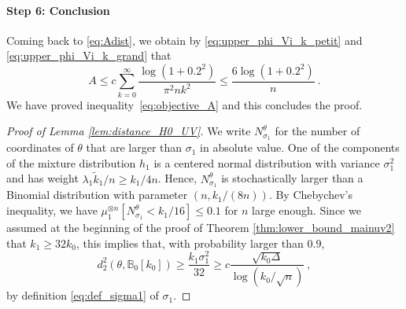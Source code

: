 \documentclass[twoside,11pt]{article}
\def\bbB{\mathbb{B}}
\newcommand{\<}{\langle}
\renewcommand{\>}{\rangle}
\begin{document}
\paragraph{Step 6: Conclusion}

Coming back to \eqref{eq:Adist}, we  obtain by 
\eqref{eq:upper_phi_Vi_k_petit} and \eqref{eq:upper_phi_Vi_k_grand} that 
\[
A \leq c \sum_{k=0}^{\infty} \frac{\log(1+0.2^2)}{\pi^2 nk^2}\leq \frac{6\log(1+0.2^2)}{ n}\ .
\]
We have proved inequality~\eqref{eq:objective_A} and this concludes the proof. 




\begin{proof}[Proof of Lemma \ref{lem:distance_H0_UV}]
We write $N^{\theta}_{\sigma_1}$ for the number of coordinates of $\theta$ that are larger than $\sigma_1$ in absolute value. One of the components of  the mixture distribution  $h_1$ is a centered normal distribution with variance $\sigma_1^2$ and has weight $\lambda_1 \tilde{k}_1/n\geq k_1/4n$. Hence, $N^{\theta}_{\sigma_1}$ is stochastically larger than a Binomial distribution with parameter $(n, k_1/(8n))$. By Chebychev's inequality, we have $\mu_1^{\otimes n}[N^{\theta}_{\sigma_1}< k_1/16]\leq 0.1$ for $n$ large enough. Since we assumed at the beginning of the proof of Theorem \ref{thm:lower_bound_mainuv2} that $k_1\geq 32k_0$, this implies that, with probability larger than $0.9$, 
\[
 d^2_2(\theta,\bbB_0[k_0]) \geq \frac{k_1 \sigma_1^2}{32}\geq c\frac{\sqrt{k_0\Delta}}{\log(k_0/\sqrt{n})}\ , 
\]
by definition \eqref{eq:def_sigma1} of $\sigma_1$.
\end{proof}
\end{document}
